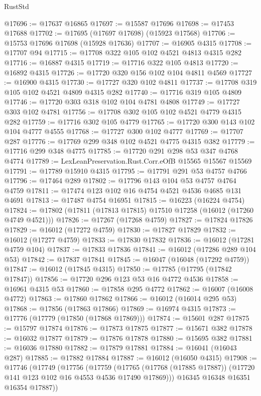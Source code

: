 \begin{lexlean}{RustStd}
\begin{coremodule}
@17696 := @17637 @16865
@17697 := @15587 @17696
@17698 := @17453 @17688
@17702 := @17695 (@17697 @17698) (@15923 @17568)
@17706 := @15753 @17696 @17698 (@15928 @17636)
@17707 := @16905 @4315
@17708 := @17707 @94
@17715 := @17708 @322 @105 @102 @4521 @4813 @4315 @282
@17716 := @16887 @4315
@17719 := @17716 @322 @105 @4813
@17720 := @16892 @4315
@17726 := @17720 @320 @156 @102 @104 @4811 @4569
@17727 := @16900 @4315
@17730 := @17727 @320 @102 @4811
@17737 := @17708 @319 @105 @102 @4521 @4809 @4315 @282
@17740 := @17716 @319 @105 @4809
@17746 := @17720 @303 @318 @102 @104 @4781 @4808
@17749 := @17727 @303 @102 @4781
@17756 := @17708 @302 @105 @102 @4521 @4779 @4315 @282
@17759 := @17716 @302 @105 @4779
@17765 := @17720 @300 @143 @102 @104 @4777 @4555
@17768 := @17727 @300 @102 @4777
@17769 := @17707 @287
@17776 := @17769 @299 @348 @102 @4521 @4775 @4315 @382
@17779 := @17716 @299 @348 @4775
@17785 := @17720 @291 @298 @53 @347 @4768 @4774
@17789 := LexLeanPreservation.Rust.Corr.eOfB @15565 @15567 @15569
@17791 := @17789 @15910 @4315
@17795 := @17791 @291 @53 @4757 @4766
@17796 := @17464 @289
@17802 := @17796 @143 @104 @53 @4757 @4764 @4759
@17811 := @17474 @123 @102 @16 @4754 @4521 @4536 @4685 @131 @4691
@17813 := @17487 @4754 @16951
@17815 := @16223 (@16224 @4754)
@17824 := @17802 (@17811 (@17813 @17815) @17510 @17258 (@16012 (@17260 @4749 @4521)))
@17826 := @17267 (@17268 @4759)
@17827 := @17824 @17826
@17829 := @16012 (@17272 @4759)
@17830 := @17827 @17829
@17832 := @16012 (@17277 @4759)
@17833 := @17830 @17832
@17836 := @16012 (@17281 @4759 @104)
@17837 := @17833 @17836
@17841 := @16012 (@17286 @289 @104 @53)
@17842 := @17837 @17841
@17845 := @16047 (@16048 (@17292 @4759))
@17847 := @16012 (@17845 @4315)
@17850 := @17785 (@17795 (@17842 @17847))
@17856 := @17720 @296 @123 @53 @16 @4772 @4536
@17858 := @16961 @4315 @53
@17860 := @17858 @295 @4772
@17862 := @16007 (@16008 @4772)
@17863 := @17860 @17862
@17866 := @16012 (@16014 @295 @53)
@17868 := @17856 (@17863 @17866)
@17869 := @16974 @4315
@17873 := @17776 (@17779 (@17850 (@17868 @17869)))
@17874 := @15601 @287
@17875 := @15797 @17874
@17876 := @17873 @17875
@17877 := @15671 @382
@17878 := @16032 @17877
@17879 := @17876 @17878
@17880 := @15695 @382
@17881 := @16036 @17880
@17882 := @17879 @17881
@17884 := @16041 (@16043 @287)
@17885 := @17882 @17884
@17887 := @16012 (@16050 @4315)
@17908 := @17746
    (@17749
      (@17756
        (@17759
          (@17765 (@17768 (@17885 @17887)) (@17720 @141 @123 @102 @16 @4553 @4536 @17490 @17869)))
        @16345
        @16348
        @16351
        @16354
        @17887))

\end{coremodule}
\end{lexlean}
